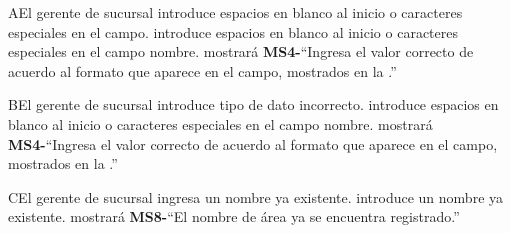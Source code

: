 		\begin{UCtrayectoriaA}{A}{El gerente de sucursal introduce espacios en blanco al inicio o caracteres especiales en el campo.}
			\UCpaso[\UCactor] introduce espacios en blanco al inicio o caracteres especiales en el campo nombre.
			\UCpaso mostrará {\bf MS4-}``Ingresa el valor correcto de acuerdo al formato que aparece en el campo, mostrados en la .''
		\end{UCtrayectoriaA}

		\begin{UCtrayectoriaA}{B}{El gerente de sucursal introduce tipo de dato incorrecto.}
			\UCpaso[\UCactor] introduce espacios en blanco al inicio o caracteres especiales en el campo nombre.
			\UCpaso mostrará {\bf MS4-}``Ingresa el valor correcto de acuerdo al formato que aparece en el campo, mostrados en la .''
		\end{UCtrayectoriaA}

		\begin{UCtrayectoriaA}{C}{El gerente de sucursal ingresa un nombre ya existente.}
			\UCpaso[\UCactor] introduce un nombre ya existente.
			\UCpaso mostrará {\bf MS8-}``El nombre de área ya se encuentra registrado.''
		\end{UCtrayectoriaA}